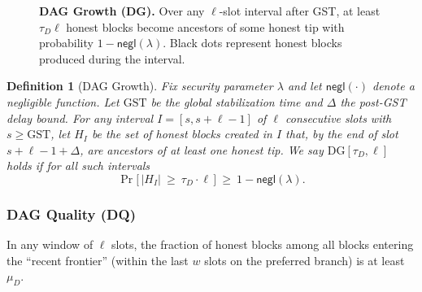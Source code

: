 \documentclass[11pt]{article}
\newtheorem{definition}[theorem]{Definition}
\newcommand{\negl}{\ensuremath{\mathsf{negl}}\xspace}
\begin{document}
\begin{figure}[htp!]
\centering
{}
\caption{\textbf{DAG Growth (DG).} 
\small
Over any $\ell$-slot interval after GST, at least $\tau_D\ell$ honest blocks become ancestors of some honest tip with probability $1-\negl(\lambda)$. 
Black dots represent honest blocks produced during the interval.}

\label{fig:dg}
\end{figure}

\begin{definition}[DAG Growth]
Fix security parameter $\lambda$ and let $\negl(\cdot)$ denote a negligible function.
Let $\mathrm{GST}$ be the global stabilization time and $\Delta$ the post-GST delay bound.
For any interval $I=[s,s+\ell-1]$ of $\ell$ consecutive slots with $s\ge \mathrm{GST}$, let
$H_I$ be the set of honest blocks created in $I$ that, by the end of slot $s+\ell-1+\Delta$, are ancestors of at least one honest tip.
We say $\mathrm{DG}[\tau_D,\ell]$ holds if for all such intervals
\begin{equation*}
\Pr\big[\,|H_I|\ \ge\ \tau_D\cdot \ell\,\big]\ \ge\ 1-\negl(\lambda).
\end{equation*}
\end{definition}


\subsubsection{DAG Quality (DQ)} 
In any window of $\ell$ slots, the fraction of honest blocks among all blocks entering the “recent frontier” (within the last $w$ slots on the preferred branch) is at least $\mu_D$.
\end{document}
